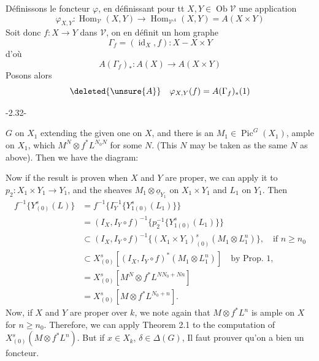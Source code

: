 
Définissons le foncteur $\varphi$, en définissant pour
tt $X,Y\in\operatorname{Ob}\mathcal V$ une application
\[
\varphi_{X,Y}:\operatorname{Hom}_{\mathcal V}(X,Y)\longrightarrow
\operatorname{Hom}_{\mathcal V^A}(X,Y)=A(X\times Y)
\]
Soit donc $f:X\longrightarrow Y$ dans $\mathcal V$, on en définit
un hom graphe
\[
\Gamma_f=(\operatorname{id}_X,f):X-X\times Y
\]
d'où
\[
A(\Gamma_f)_*:A(X)\longrightarrow A(X\times Y)
\]
Posons alors
\[
\deleted{\unsure{A}}\quad\varphi_{X,Y}(f)=A(\Gamma_f)_*(1)
\]
\begin{center}-2.32-\end{center}
$G$ on $X_1$ extending the given one on $X$, and there is an $M_1\in\operatorname{Pic}^G(X_1)$,
ample on $X_1$, which  $M^N\otimes f^*L^{N_0N}$ for some $N$. (This $N$ may be taken
as the same $N$ as above). Then we have the diagram:

Now if the result is proven when $X$ and $Y$ are proper, we can
apply it to $p_2:X_1\times Y_1\longrightarrow Y_1$, and the sheaves $M_1\otimes\underline{o}_{Y_1}$ on $X_1\times Y_1$
and $L_1$ on $Y_1$. Then
\[
\begin{aligned}
f^{-1}\{Y^s_{(0)}(L)\}&=f^{-1}\{I_Y^{-1}\{Y^s_{1(0)}(L_1)\}\}\\
&=(I_X,I_Y\circ f)^{-1}\{p_2^{-1}\{Y^s_{1(0)}(L_1)\}\}\\
&\subset (I_X,I_Y\circ f)^{-1}\{(X_1\times Y_1)^s_{(0)}(M_1\otimes L_1^n)\},\quad\text{if }n\geq n_0\\
&\subset X^s_{(0)}\left[(I_X,I_Y\circ f)^*(M_1\otimes L_1^n)\right]\quad\text{by Prop. 1},\\
&=X^s_{(0)}\left[M^N\otimes f^*L^{NN_0+Nn}\right]\\
&=X^s_{(0)}\left[M\otimes f^*L^{N_0+n}\right].
\end{aligned}
\]
Now, if $X$ and $Y$ are proper over $k$, we note again that
$M\otimes f^*L^n$ is ample on $X$ for $n\geq n_0$. Therefore, we can apply Theorem
2.1 to the computation of $X^s_{(0)}(M\otimes f^*L^n)$. But if $x\in X_k$, $\delta\in\Delta(G)$,
Il faut prouver qu'on a bien un foncteur.

